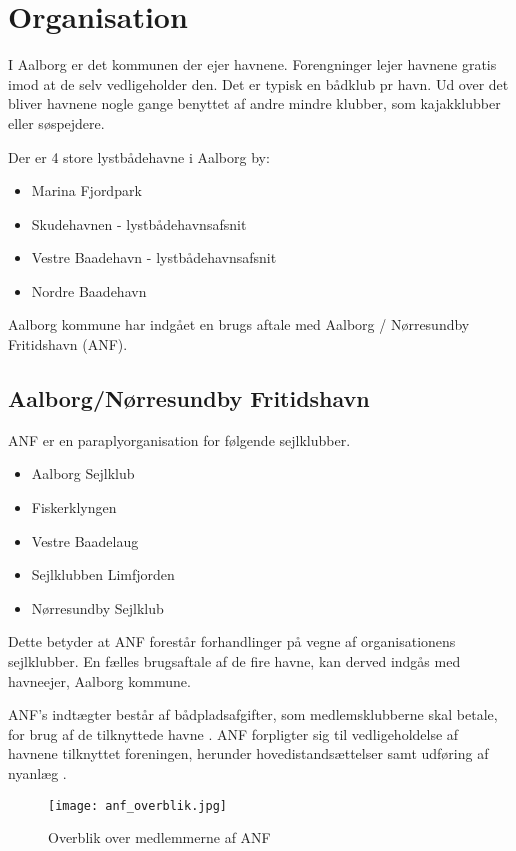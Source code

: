 \section{Organisation}

I Aalborg er det kommunen der ejer havnene. Forengninger lejer havnene gratis imod at de selv vedligeholder den. Det er typisk en bådklub pr havn. Ud over det bliver havnene nogle gange benyttet af andre mindre klubber, som kajakklubber eller søspejdere.

Der er 4 store lystbådehavne i Aalborg by:
\begin{itemize}
    \item Marina Fjordpark
    \item Skudehavnen - lystbådehavnsafsnit
    \item Vestre Baadehavn - lystbådehavnsafsnit
    \item Nordre Baadehavn
\end{itemize}

Aalborg kommune har indgået en brugs aftale med Aalborg / Nørresundby Fritidshavn (ANF).

\subsection{Aalborg/Nørresundby Fritidshavn}

ANF er en paraplyorganisation for følgende sejlklubber. \cite{anf_havnereglement}
\begin{itemize}
	\item Aalborg Sejlklub
	\item Fiskerklyngen
	\item Vestre Baadelaug
	\item Sejlklubben Limfjorden
	\item Nørresundby Sejlklub
\end{itemize}
 
 Dette betyder at ANF forestår forhandlinger på vegne af organisationens sejlklubber. En fælles brugsaftale af de fire havne, kan derved indgås med havneejer, Aalborg kommune.

 ANF's indtægter består af bådpladsafgifter, som medlemsklubberne skal betale, for brug af de tilknyttede havne \cite{anf_budget_2013}. ANF forpligter sig til vedligeholdelse af havnene tilknyttet foreningen, herunder hovedistandsættelser samt udføring af nyanlæg \cite{anf_brugsaftale_2012}.

 \begin{figure}
 	\begin{center}
 		\texttt{[image: anf\_overblik.jpg]}
 	\end{center}
 	\caption{Overblik over medlemmerne af ANF}
 	\label{fig:anf_overblik}
 \end{figure}

